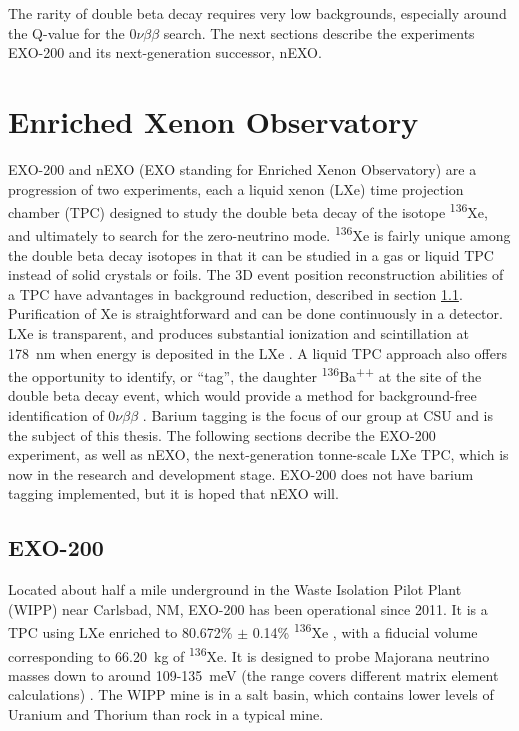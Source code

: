 
The rarity of double beta decay requires very low backgrounds, especially around the Q-value for the $0\nu\beta\beta$ search. The next sections describe the experiments EXO-200 and its next-generation successor, nEXO.

\section{Enriched Xenon Observatory}

EXO-200 and nEXO (EXO standing for Enriched Xenon Observatory) are a progression of two experiments, each a liquid xenon (LXe) time projection chamber (TPC) designed to study the double beta decay of the isotope \textsuperscript{136}Xe, and ultimately to search for the zero-neutrino mode.  \textsuperscript{136}Xe is fairly unique among the double beta decay isotopes in that it can be studied in a gas or liquid TPC instead of solid crystals or foils.  The 3D event position reconstruction abilities of a TPC have advantages in background reduction, described in section \ref{subsec:EXO200}.  Purification of Xe is straightforward and can be done continuously in a detector.  LXe is transparent, and produces substantial ionization and scintillation at 178~nm when energy is deposited in the LXe \cite{EXO200TwoNuLong}.  A liquid TPC approach also offers the opportunity to identify, or ``tag'', the daughter \textsuperscript{136}Ba\textsuperscript{++} at the site of the double beta decay event, which would provide a method for background-free identification of $0\nu\beta\beta$ \cite{Moe1991}. Barium tagging is the focus of our group at CSU and is the subject of this thesis.  The following sections decribe the EXO-200 experiment, as well as nEXO, the next-generation tonne-scale LXe TPC, which is now in the research and development stage.  EXO-200 does not have barium tagging implemented, but it is hoped that nEXO will. 

\subsection{EXO-200}
\label{subsec:EXO200}


Located about half a mile underground in the Waste Isolation Pilot Plant (WIPP) near Carlsbad, NM, EXO-200 has been operational since 2011.  It is a TPC using LXe enriched to 80.672\% $\pm$ 0.14\% \textsuperscript{136}Xe \cite{EXO200TwoNuLong}, with a fiducial volume corresponding to 66.20~kg of \textsuperscript{136}Xe. It is designed to probe Majorana neutrino masses down to around 109-135~meV (the range covers different matrix element calculations) \cite{EXO200instrumentationPart1}.  The WIPP mine is in a salt basin, which contains lower levels of Uranium and Thorium than rock in a typical mine.

